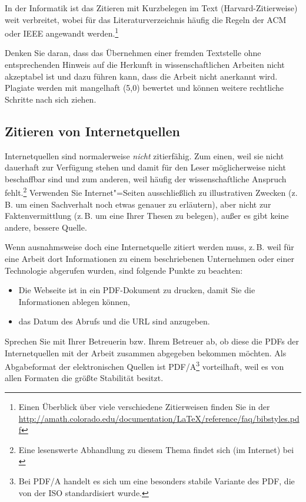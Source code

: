 \documentclass[a4paper,11pt,headings=normal]{scrartcl}
\begin{document}
In der Informatik ist das Zitieren mit Kurzbelegen im Text (Harvard-Zitierweise) weit verbreitet, wobei für das Literaturverzeichnis häufig die Regeln der \acs{ACM} oder \acs{IEEE} angewandt werden.\footnote{Einen Überblick über viele verschiedene Zitierweisen finden Sie in der \url{http://amath.colorado.edu/documentation/LaTeX/reference/faq/bibstyles.pdf}}

Denken Sie daran, dass das Übernehmen einer fremden Textstelle ohne entsprechenden Hinweis auf die Herkunft in wissenschaftlichen Arbeiten nicht akzeptabel ist und dazu führen kann, dass die Arbeit nicht anerkannt wird. Plagiate werden mit mangelhaft (5,0) bewertet und können weitere rechtliche Schritte nach sich ziehen.

\subsection{Zitieren von Internetquellen}
Internetquellen sind normalerweise \textit{nicht} zitierfähig. Zum einen, weil sie nicht dauerhaft zur Verfügung stehen und damit für den Leser möglicherweise nicht beschaffbar sind und zum anderen, weil häufig der wissenschaftliche Anspruch fehlt.\footnote{Eine lesenswerte Abhandlung zu diesem Thema findet sich (im Internet) bei \autocite{Weber2006}} Verwenden Sie Internet"=Seiten ausschließlich zu illustrativen Zwecken (z.\,B. um einen Sachverhalt noch etwas genauer zu erläutern), aber nicht zur Faktenvermittlung (z.\,B. um eine Ihrer Thesen zu belegen), außer es gibt keine andere, bessere Quelle.

Wenn ausnahmsweise doch eine Internetquelle zitiert werden muss, z.\,B. weil für eine Arbeit dort Informationen zu einem beschriebenen Unternehmen oder einer Technologie abgerufen wurden, sind folgende Punkte zu beachten:

\begin{itemize}
\item Die Webseite ist in ein PDF-Dokument zu drucken, damit Sie die Informationen ablegen können,
\item das Datum des Abrufs und die URL sind anzugeben.
\end{itemize}

Sprechen Sie mit Ihrer Betreuerin bzw. Ihrem Betreuer ab, ob diese die PDFs der Internetquellen mit der Arbeit zusammen abgegeben bekommen möchten. Als Abgabeformat der elektronischen Quellen ist PDF/A\footnote{Bei PDF/A handelt es sich um eine besonders stabile Variante des \ac{PDF}, die von der \ac{ISO} standardisiert wurde.} vorteilhaft, weil es von allen Formaten die größte Stabilität besitzt.
\end{document}
